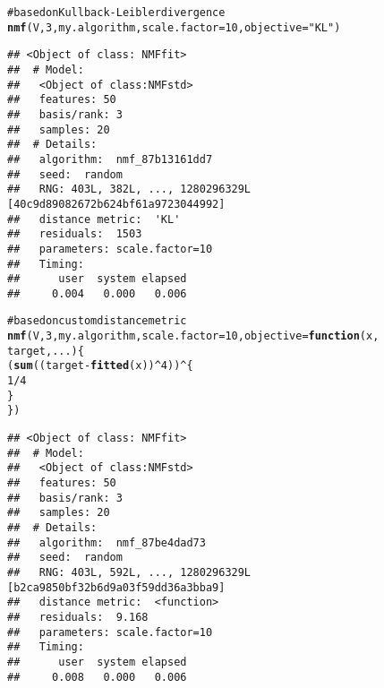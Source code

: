\documentclass[a4paper]{article}\usepackage{graphicx, color}
\makeatletter
\newcommand{\hlfunctioncall}[1]{\textcolor[rgb]{0.501960784313725,0,0.329411764705882}{\textbf{#1}}}%
\newcommand{\hlstring}[1]{\textcolor[rgb]{0.6,0.6,1}{#1}}%
\newcommand{\hlcomment}[1]{\textcolor[rgb]{0.180392156862745,0.6,0.341176470588235}{#1}}%
\newenvironment{kframe}{%
 \def\at@end@of@kframe{}%
 \ifinner\ifhmode%
  \def\at@end@of@kframe{\end{minipage}}%
  \begin{minipage}{\columnwidth}%
 \fi\fi%
 \def\FrameCommand##1{\hskip\@totalleftmargin \hskip-\fboxsep
 \colorbox{shadecolor}{##1}\hskip-\fboxsep
     \hskip-\linewidth \hskip-\@totalleftmargin \hskip\columnwidth}%
 \MakeFramed {\advance\hsize-\width
   \@totalleftmargin\z@ \linewidth\hsize
   \@setminipage}}%
 {\par\unskip\endMakeFramed%
 \at@end@of@kframe}
\newenvironment{knitrout}{}{} %
\makeatother
\begin{document}
\begin{knitrout}
\color{fgcolor}\begin{kframe}
\begin{alltt}
\hlcomment{# based on Kullback-Leibler divergence}
\hlfunctioncall{nmf}(V, 3, my.algorithm, scale.factor = 10, objective = \hlstring{"KL"})
\end{alltt}
\begin{verbatim}
## <Object of class: NMFfit>
##  # Model:
##   <Object of class:NMFstd>
##   features: 50 
##   basis/rank: 3 
##   samples: 20 
##  # Details:
##   algorithm:  nmf_87b13161dd7 
##   seed:  random 
##   RNG: 403L, 382L, ..., 1280296329L [40c9d89082672b624bf61a9723044992]
##   distance metric:  'KL' 
##   residuals:  1503 
##   parameters: scale.factor=10 
##   Timing:
##      user  system elapsed 
##     0.004   0.000   0.006
\end{verbatim}
\begin{alltt}
\hlcomment{# based on custom distance metric}
\hlfunctioncall{nmf}(V, 3, my.algorithm, scale.factor = 10, objective = \hlfunctioncall{function}(x, 
    target, ...) \{
    (\hlfunctioncall{sum}((target - \hlfunctioncall{fitted}(x))^4))^\{
        1/4
    \}
\})
\end{alltt}
\begin{verbatim}
## <Object of class: NMFfit>
##  # Model:
##   <Object of class:NMFstd>
##   features: 50 
##   basis/rank: 3 
##   samples: 20 
##  # Details:
##   algorithm:  nmf_87be4dad73 
##   seed:  random 
##   RNG: 403L, 592L, ..., 1280296329L [b2ca9850bf32b6d9a03f59dd36a3bba9]
##   distance metric:  <function> 
##   residuals:  9.168 
##   parameters: scale.factor=10 
##   Timing:
##      user  system elapsed 
##     0.008   0.000   0.006
\end{verbatim}
\end{kframe}
\end{knitrout}


%
%
\end{document}
